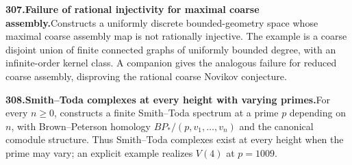 \documentclass[11pt,a4paper]{article}
\begin{document}
  \par \begin{minipage}{\linewidth}
  \fontsize{10.5}{12.6}\selectfont\RaggedRight
  \hypertarget{result 307}{}
  {\bfseries\textcolor{muted}{307.}\enspace Failure of rational injectivity for maximal coarse assembly.}\enspace Constructs a uniformly discrete bounded-geometry space whose maximal coarse assembly map is not rationally injective. The example is a coarse disjoint union of finite connected graphs of uniformly bounded degree, with an infinite-order kernel class. A companion gives the analogous failure for reduced coarse assembly, disproving the rational coarse Novikov conjecture.\par
  \end{minipage}\par\vspace{5pt}



  \par \begin{minipage}{\linewidth}
  \fontsize{10.5}{12.6}\selectfont\RaggedRight
  \hypertarget{result 308}{}
  {\bfseries\textcolor{muted}{308.}\enspace Smith--Toda complexes at every height with varying primes.}\enspace For every $n\ge0$, constructs a finite Smith--Toda spectrum at a prime $p$ depending on $n$, with Brown--Peterson homology $BP_*/(p,v_1,\ldots,v_n)$ and the canonical comodule structure. Thus Smith--Toda complexes exist at every height when the prime may vary; an explicit example realizes $V(4)$ at $p=1009$.\par
  \end{minipage}\par\vspace{5pt}
\end{document}
